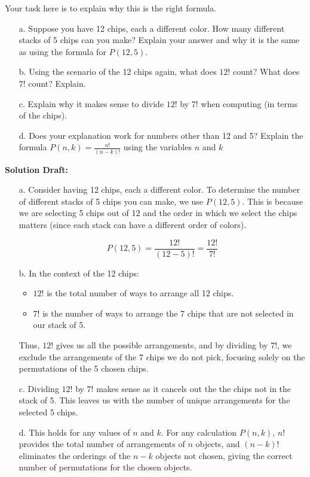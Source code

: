 \documentclass{article}
\begin{document}
Your task here is to explain why this is the right formula.
\begin{enumerate}
\item[a.]Suppose you have 12 chips, each a different color. How many different stacks of 5 chips can you make? Explain your answer and why it is the same as using the formula for $P(12,5)$.

\item[b.]Using the scenario of the 12 chips again, what does $12!$ count? What does $7!$ count? Explain.

\item[c.]Explain why it makes sense to divide $12!$ by $7!$ when computing (in terms of the chips).

\item[d.]Does your explanation work for numbers other than 12 and 5? Explain the formula $P(n,k)=\frac{n!}{(n-k)!}$
using the variables $n$ and $k$
\end{enumerate}
\noindent\textbf{Solution Draft:} 
\begin{enumerate}

\item[a.]Consider having 12 chips, each a different color. To determine the number of different stacks of 5 chips you can make, we use \( P(12, 5) \). This is because we are selecting 5 chips out of 12 and the order in which we select the chips matters (since each stack can have a different order of colors).

\[ P(12, 5) = \frac{12!}{(12-5)!} = \frac{12!}{7!} \]

\item[b.]In the context of the 12 chips:
\begin{itemize}
    \item \( 12! \) is the total number of ways to arrange all 12 chips.
    \item \( 7! \) is the number of ways to arrange the 7 chips that are not selected in our stack of 5.
\end{itemize}
Thus, \( 12! \) gives us all the possible arrangements, and by dividing by \( 7! \), we exclude the arrangements of the 7 chips we do not pick, focusing solely on the permutations of the 5 chosen chips.

\item[c.]
Dividing \( 12! \) by \( 7! \) makes sense as it cancels out the the chips not in the stack of 5. This leaves us with the number of unique arrangements for the selected 5 chips.

\item[d.]This holds for any values of \( n \) and \( k \). For any calculation \( P(n, k) \), \( n! \) provides the total number of arrangements of \( n \) objects, and \( (n-k)! \) eliminates the orderings of the \( n-k \) objects not chosen, giving the correct number of permutations for the chosen objects.

\end{enumerate}
\end{document}
